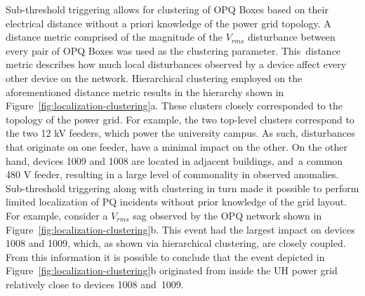 \documentclass[energies,article,accept,moreauthors,pdftex]{Definitions/mdpi}
\begin{document}
Sub-threshold triggering allows for clustering of OPQ Boxes based on their electrical distance without a priori knowledge of the power grid topology.
A distance metric comprised of the magnitude of the $V_{rms}$ disturbance between every pair of OPQ Boxes was used as the clustering parameter.
This~distance metric describes how much local disturbances observed by a device affect every other device on the network.
Hierarchical clustering employed on the aforementioned distance metric results in the hierarchy shown in Figure~\ref{fig:localization-clustering}a.
These clusters closely corresponded to the topology of the power grid.
For example, the two top-level clusters correspond to the two 12 kV feeders, which power the university campus.
As such, disturbances that originate on one feeder, have a minimal impact on the other.
On the other hand, devices 1009 and 1008 are located in adjacent buildings, and~a common 480 V feeder, resulting in a large level of commonality in observed anomalies.
Sub-threshold triggering along with clustering in turn made it possible to perform limited localization of PQ incidents without prior knowledge of the grid layout.
For example, consider a $V_{rms}$ sag observed by the OPQ network shown in Figure~\ref{fig:localization-clustering}b.
This event had the largest impact on devices 1008 and 1009, which, as shown via hierarchical clustering, are closely coupled.
From this information it is possible to conclude that the event depicted in Figure~\ref{fig:localization-clustering}b originated from inside the UH power grid relatively close to devices 1008 and~1009.
\end{document}
